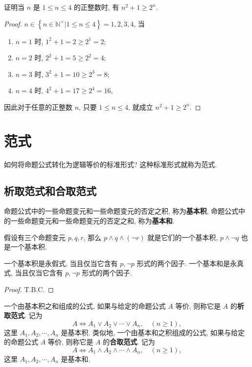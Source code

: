 \documentclass[10pt,UTF8]{book} %
\begin{document}
\begin{example}
    证明当 $n$ 是 $1 \leqslant n \leqslant 4$ 的正整数时, 有 $n^2 + 1 \geqslant2^n$.
\begin{proof}
    $n \in \left\{ n \in \mathbb{N^+} | 1 \leqslant n \leqslant 4 \right\} = {1,2,3,4}$, 当
\begin{enumerate}
        \item $n=1$ 时, $1^2 + 1 = 2 \geqslant 2^1 = 2$;
        \item $n=2$ 时, $2^2 +1 = 5 \geqslant 2^2 =4$;
        \item $n=3$ 时, $3^2 + 1 = 10 \geqslant 2^3 = 8$;
        \item $n=4$ 时, $4^2 + 1  = 17 \geqslant 2^4 = 16$,
\end{enumerate}
    因此对于任意的正整数 $n$, 只要 $1 \leqslant n \leqslant 4$, 就成立 $n^2 + 1 \geqslant 2^n$.
\end{proof}
\end{example}

\section{范式}

如何将命题公式转化为逻辑等价的标准形式? 这种标准形式就称为范式.

\subsection{析取范式和合取范式}

\begin{definition}
    命题公式中的一些命题变元和一些命题变元的否定之积, 称为\textbf{基本积},
    命题公式中的一些命题变元和一些命题变元的否定之和, 称为\textbf{基本和}.
\end{definition}

\begin{example}
    假设有三个命题变元 $p,q,r$, 那么 $p \wedge q \wedge (\lnot r)$ 就是它们的一个基本积,
    $p \wedge \lnot q$ 也是一个基本积.
\end{example}

\begin{thm}
    一个基本积是永假式, 当且仅当它含有 $p, \lnot p$ 形式的两个因子.
    一个基本和是永真式, 当且仅当它含有 $p, \lnot p$ 形式的两个因子.
    \begin{proof}
        T.B.C.
    \end{proof}
\end{thm}

\begin{definition}
    一个由基本积之和组成的公式, 如果与给定的命题公式 $A$ 等价, 则称它是 $A$ 的\textbf{析取范式}.
    记为 \[ A \iff A_1 \vee A_2 \vee \cdots \vee A_n, \quad (n \geqslant 1), \]
    这里 $A_1, A_2, \cdots, A_n$ 是基本积.
    类似地, 一个由基本和之积组成的公式, 如果与给定的命题公式 $A$ 等价, 则称它是 $A$
    的\textbf{合取范式}. 记为 \[ A \iff A_1 \wedge A_2 \wedge \cdots \wedge A_n, \quad (n \geqslant 1), \]
    这里 $A_1, A_2, \cdots, A_n$ 是基本和.
\end{definition}
\end{document}
